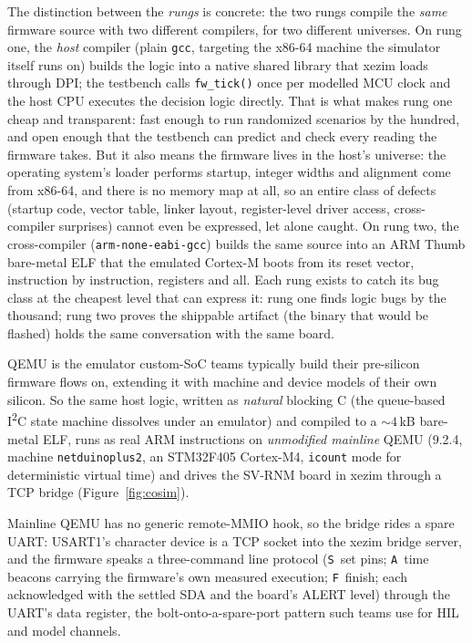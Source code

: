\documentclass[11pt]{article}
\newcommand{\iic}{I\textsuperscript{2}C}
\begin{document}
The distinction between the \emph{rungs} is concrete: the two rungs compile the \emph{same}
firmware source with two different compilers, for two different
universes.  On rung one, the \emph{host} compiler (plain
\texttt{gcc}, targeting the x86-64 machine the simulator itself runs
on) builds the logic into a native shared library that xezim
loads through DPI; the testbench calls \texttt{fw\_tick()} once per
modelled MCU clock and the host CPU executes the decision logic
directly.  That is what makes rung one cheap and transparent:
fast enough to run randomized scenarios by the hundred, and open
enough that the testbench can predict and check every reading the
firmware takes.  But it also means the firmware
lives in the host's universe: the operating system's loader performs
startup, integer widths and alignment come from x86-64, and there is
no memory map at all, so an entire class of defects (startup code,
vector table, linker layout, register-level driver access,
cross-compiler surprises) cannot even be expressed, let alone
caught.  On rung two, the cross-compiler
(\texttt{arm-none-eabi-gcc}) builds the same source into an ARM
Thumb bare-metal ELF that the emulated Cortex-M boots from its reset
vector, instruction by instruction, registers and all.  Each rung
exists to catch its bug class at the cheapest level that can express
it: rung one finds logic bugs by the thousand; rung two proves the
shippable artifact (the binary that would be flashed) holds
the same conversation with the same board.

QEMU is the emulator custom-SoC teams typically build their
pre-silicon firmware flows on, extending it with machine and device
models of their own silicon.  So the same host logic, written as
\emph{natural} blocking C (the queue-based \iic{} state machine
dissolves under an emulator) and compiled to a ${\sim}4$\,kB
bare-metal ELF, runs as real ARM instructions on \emph{unmodified
mainline} QEMU (9.2.4, machine \texttt{netduinoplus2}, an STM32F405
Cortex-M4, \texttt{icount} mode for deterministic virtual time) and
drives the SV-RNM board in xezim through a TCP bridge
(Figure~\ref{fig:cosim}).

Mainline QEMU has no generic remote-MMIO hook, so the bridge rides a
spare UART: \mbox{USART1}'s character device is a TCP socket into
the xezim bridge server, and the firmware speaks a three-command
line protocol (\texttt{S}~set pins; \texttt{A}~time beacons carrying
the firmware's own measured execution; \texttt{F}~finish; each
acknowledged with the settled SDA and the board's ALERT level)
through the UART's data register, the bolt-onto-a-spare-port pattern
such teams use for HIL and model channels.
\end{document}
